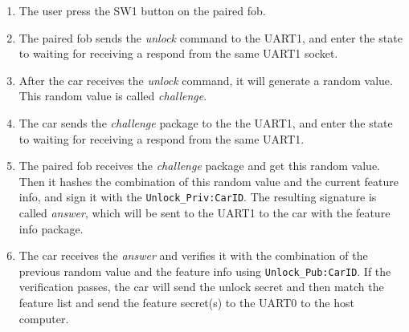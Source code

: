 \documentclass[11pt,oneside,onecolumn,letterpaper]{article}
\begin{document}
\begin{enumerate}
	\item The user press the SW1 button on the paired fob.
	\item The paired fob sends the \textit{unlock} command to the UART1, and enter the state to waiting for receiving a respond from the same UART1 socket.
	\item After the car receives the \textit{unlock} command, it will generate a random value. This random value is called \textit{challenge}.
	\item The car sends the \textit{challenge} package to the the UART1, and enter the state to waiting for receiving a respond from the same UART1.
	\item The paired fob receives the \textit{challenge} package and get this random value. Then it hashes the combination of this random value and the current feature info, and sign it with the \verb|Unlock_Priv:CarID|. The resulting signature is called \textit{answer}, which will be sent to the UART1 to the car with the feature info package.
	\item The car receives the \textit{answer} and verifies it with the combination of the previous random value and the feature info using \verb|Unlock_Pub:CarID|. If the verification passes, the car will send the unlock secret and then match the feature list and send the feature secret(s) to the UART0 to the host computer.
\end{enumerate}
\end{document}
